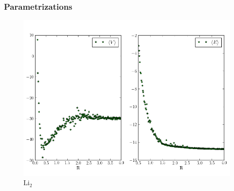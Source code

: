 \documentclass{beamer}
\begin{document}
\begin{frame}\frametitle{Parametrizations}
 \begin{figure}
 \begin{center}
  \includegraphics[scale=0.35]{R_vs_E_lit_pure.png}
  \caption{$\mathrm{Li_2}$}
 \end{center}
\end{figure}
\end{frame}


\section*{}
\subsection*{}

\begin{frame}
 
 
\end{frame}
\end{document}
